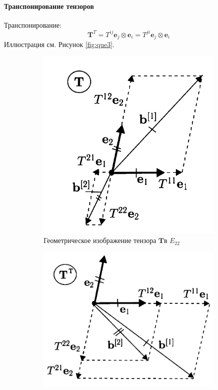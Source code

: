 \paragraph{Транспонирование тензоров}
Транспонирование:
\begin{equation*}
	\mathbf{T}^T=T^{ij}\mathbf{e}_j\otimes\mathbf{e}_i=T^{ji}\mathbf{e}_j\otimes\mathbf{e}_i
\end{equation*}
Иллюстрация см. Рисунок \ref{fig:que3}.
\begin{figure}[H]
	\hfill
	\begin{subfigure}{0.44\textwidth}
		\centering
	\includegraphics[width=\linewidth]{img/que3_1}
	\caption{Геометрическое изображение тензора $\mathbf{T}$в $E_{22}$}
	\end{subfigure}
	\hfill
	\begin{subfigure}{0.54\textwidth}
		\centering
	\includegraphics[width=\linewidth]{img/que3}

\end{subfigure}
\end{figure}
